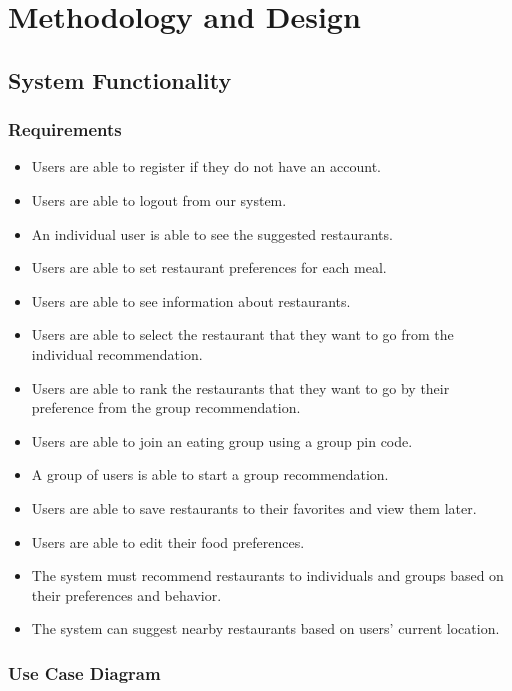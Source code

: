 \documentclass[12pt,oneside,openright,a4paper]{cpe-english-project}
\begin{document}
\chapter{Methodology and Design}

\section{System Functionality}
\subsection{Requirements}
\begin{itemize}
\item Users are able to register if they do not have an account.
\item Users are able to logout from our system.
\item An individual user is able to see the suggested restaurants.
\item Users are able to set restaurant preferences for each meal.
\item Users are able to see information about restaurants.
\item Users are able to select the restaurant that they want to go from the individual recommendation.
\item Users are able to rank the restaurants that they want to go by their preference from the group recommendation.
\item Users are able to join an eating group using a group pin code.
\item A group of users is able to start a group recommendation.
\item Users are able to save restaurants to their favorites and view them later.
\item Users are able to edit their food preferences.
\item The system must recommend restaurants to individuals and groups based on their preferences and behavior.
\item The system can suggest nearby restaurants based on users’ current location.
\end{itemize}


\newpage
\subsection{Use Case Diagram}
\end{document}
